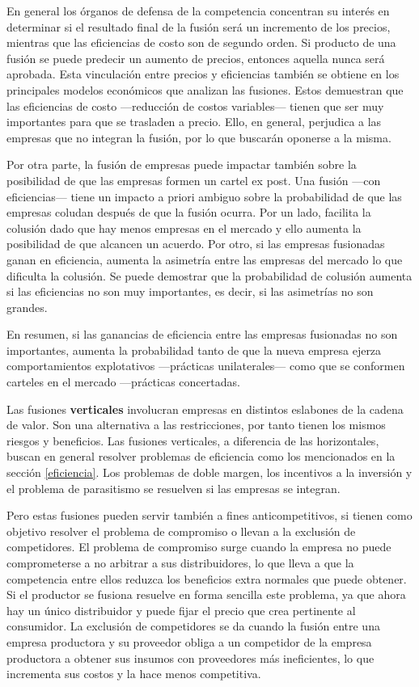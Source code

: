 \documentclass[
  12pt,
  spanish,
]{book}
\begin{document}
En general los órganos de defensa de la competencia concentran su interés en determinar si el resultado final de la fusión será un incremento de los precios, mientras que las eficiencias de costo son de segundo orden. Si producto de una fusión se puede predecir un aumento de precios, entonces aquella nunca será aprobada. Esta vinculación entre precios y eficiencias también se obtiene en los principales modelos económicos que analizan las fusiones. Estos demuestran que las eficiencias de costo ---reducción de costos variables--- tienen que ser muy importantes para que se trasladen a precio. Ello, en general, perjudica a las empresas que no integran la fusión, por lo que buscarán oponerse a la misma.

Por otra parte, la fusión de empresas puede impactar también sobre la posibilidad de que las empresas formen un cartel ex post. Una fusión ---con eficiencias--- tiene un impacto a priori ambiguo sobre la probabilidad de que las empresas coludan después de que la fusión ocurra. Por un lado, facilita la colusión dado que hay menos empresas en el mercado y ello aumenta la posibilidad de que alcancen un acuerdo. Por otro, si las empresas fusionadas ganan en eficiencia, aumenta la asimetría entre las empresas del mercado lo que dificulta la colusión. Se puede demostrar que la probabilidad de colusión aumenta si las eficiencias no son muy importantes, es decir, si las asimetrías no son grandes.

En resumen, si las ganancias de eficiencia entre las empresas fusionadas no son importantes, aumenta la probabilidad tanto de que la nueva empresa ejerza comportamientos explotativos ---prácticas unilaterales--- como que se conformen carteles en el mercado ---prácticas concertadas.

Las fusiones \textbf{verticales} involucran empresas en distintos eslabones de la cadena de valor. Son una alternativa a las restricciones, por tanto tienen los mismos riesgos y beneficios. Las fusiones verticales, a diferencia de las horizontales, buscan en general resolver problemas de eficiencia como los mencionados en la sección \ref{eficiencia}. Los problemas de doble margen, los incentivos a la inversión y el problema de parasitismo se resuelven si las empresas se integran.

Pero estas fusiones pueden servir también a fines anticompetitivos, si tienen como objetivo resolver el problema de compromiso o llevan a la exclusión de competidores. El problema de compromiso surge cuando la empresa no puede comprometerse a no arbitrar a sus distribuidores, lo que lleva a que la competencia entre ellos reduzca los beneficios extra normales que puede obtener. Si el productor se fusiona resuelve en forma sencilla este problema, ya que ahora hay un único distribuidor y puede fijar el precio que crea pertinente al consumidor. La exclusión de competidores se da cuando la fusión entre una empresa productora y su proveedor obliga a un competidor de la empresa productora a obtener sus insumos con proveedores más ineficientes, lo que incrementa sus costos y la hace menos competitiva.
\end{document}
